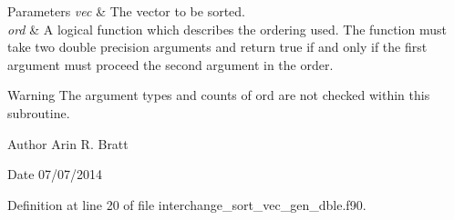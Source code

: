 \begin{DoxyParams}{Parameters}
{\em vec} & The vector to be sorted.\\
\hline
{\em ord} & A logical function which describes the ordering used. The function must take two double precision arguments and return true if and only if the first argument must proceed the second argument in the order.\\
\hline
\end{DoxyParams}
\begin{DoxyWarning}{Warning}
The argument types and counts of ord are not checked within this subroutine.
\end{DoxyWarning}
\begin{DoxyAuthor}{Author}
Arin R. Bratt 
\end{DoxyAuthor}
\begin{DoxyDate}{Date}
07/07/2014 
\end{DoxyDate}


Definition at line 20 of file interchange\-\_\-sort\-\_\-vec\-\_\-gen\-\_\-dble.\-f90.

